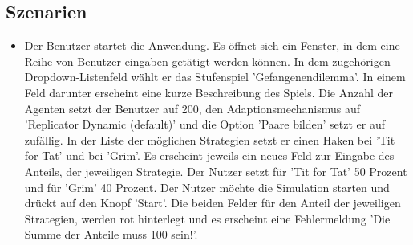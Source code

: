 \subsection{Szenarien}

\begin{itemize}

\item Der Benutzer startet die Anwendung. Es öffnet sich ein Fenster, in dem eine Reihe von Benutzer eingaben getätigt werden können. In dem zugehörigen Dropdown-Listenfeld wählt er das Stufenspiel 'Gefangenendilemma'. In einem Feld darunter erscheint eine kurze Beschreibung des Spiels.
Die Anzahl der Agenten setzt der Benutzer auf 200, den Adaptionsmechanismus auf 'Replicator Dynamic (default)' und die Option 'Paare bilden' setzt er auf zufällig. In der Liste der möglichen Strategien setzt er einen Haken bei 'Tit for Tat' und bei 'Grim'. Es erscheint jeweils ein neues Feld zur Eingabe des Anteils, der jeweiligen Strategie. Der Nutzer setzt für 'Tit for Tat' 50 Prozent und für 'Grim' 40 Prozent. Der Nutzer möchte die Simulation starten und drückt auf den Knopf 'Start'. Die beiden Felder für den Anteil der jeweiligen Strategien, werden rot hinterlegt und es erscheint eine Fehlermeldung 'Die Summe der Anteile muss 100 sein!'.

\end{itemize}
